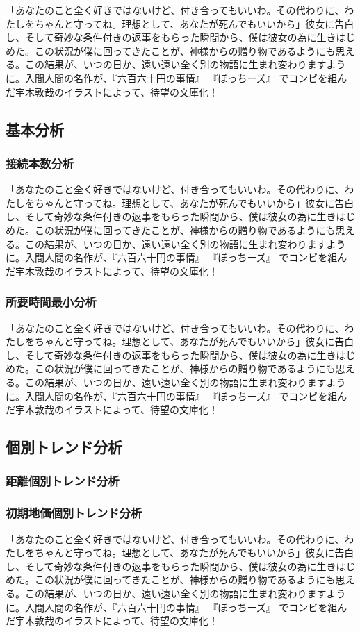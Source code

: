 「あなたのこと全く好きではないけど、付き合ってもいいわ。その代わりに、わたしをちゃんと守ってね。理想として、あなたが死んでもいいから」彼女に告白し、そして奇妙な条件付きの返事をもらった瞬間から、僕は彼女の為に生きはじめた。この状況が僕に回ってきたことが、神様からの贈り物であるようにも思える。この結果が、いつの日か、遠い遠い全く別の物語に生まれ変わりますように。入間人間の名作が、『六百六十円の事情』 『ぼっちーズ』 でコンビを組んだ宇木敦哉のイラストによって、待望の文庫化！
\subsection{基本分析}
\subsubsection{接続本数分析}

「あなたのこと全く好きではないけど、付き合ってもいいわ。その代わりに、わたしをちゃんと守ってね。理想として、あなたが死んでもいいから」彼女に告白し、そして奇妙な条件付きの返事をもらった瞬間から、僕は彼女の為に生きはじめた。この状況が僕に回ってきたことが、神様からの贈り物であるようにも思える。この結果が、いつの日か、遠い遠い全く別の物語に生まれ変わりますように。入間人間の名作が、『六百六十円の事情』 『ぼっちーズ』 でコンビを組んだ宇木敦哉のイラストによって、待望の文庫化！

\subsubsection{所要時間最小分析}

「あなたのこと全く好きではないけど、付き合ってもいいわ。その代わりに、わたしをちゃんと守ってね。理想として、あなたが死んでもいいから」彼女に告白し、そして奇妙な条件付きの返事をもらった瞬間から、僕は彼女の為に生きはじめた。この状況が僕に回ってきたことが、神様からの贈り物であるようにも思える。この結果が、いつの日か、遠い遠い全く別の物語に生まれ変わりますように。入間人間の名作が、『六百六十円の事情』 『ぼっちーズ』 でコンビを組んだ宇木敦哉のイラストによって、待望の文庫化！

\subsection{個別トレンド分析}
\subsubsection{距離個別トレンド分析}
\subsubsection{初期地価個別トレンド分析}

「あなたのこと全く好きではないけど、付き合ってもいいわ。その代わりに、わたしをちゃんと守ってね。理想として、あなたが死んでもいいから」彼女に告白し、そして奇妙な条件付きの返事をもらった瞬間から、僕は彼女の為に生きはじめた。この状況が僕に回ってきたことが、神様からの贈り物であるようにも思える。この結果が、いつの日か、遠い遠い全く別の物語に生まれ変わりますように。入間人間の名作が、『六百六十円の事情』 『ぼっちーズ』 でコンビを組んだ宇木敦哉のイラストによって、待望の文庫化！

